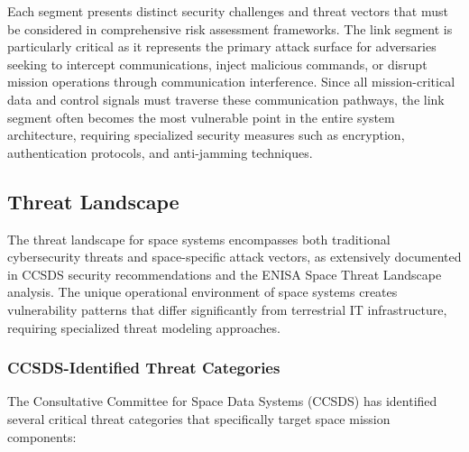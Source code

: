 \documentclass[binding=0.6cm]{sapthesis}
\begin{document}
Each segment presents distinct security challenges and threat vectors that must be considered in comprehensive risk assessment frameworks. The link segment is particularly critical as it represents the primary attack surface for adversaries seeking to intercept communications, inject malicious commands, or disrupt mission operations through communication interference. Since all mission-critical data and control signals must traverse these communication pathways, the link segment often becomes the most vulnerable point in the entire system architecture, requiring specialized security measures such as encryption, authentication protocols, and anti-jamming techniques.

\subsection{Threat Landscape}

The threat landscape for space systems encompasses both traditional cybersecurity threats and space-specific attack vectors, as extensively documented in CCSDS security recommendations and the ENISA Space Threat Landscape analysis. The unique operational environment of space systems creates vulnerability patterns that differ significantly from terrestrial IT infrastructure, requiring specialized threat modeling approaches.

\subsubsection{CCSDS-Identified Threat Categories}

The Consultative Committee for Space Data Systems (CCSDS) has identified several critical threat categories that specifically target space mission components:
\end{document}
